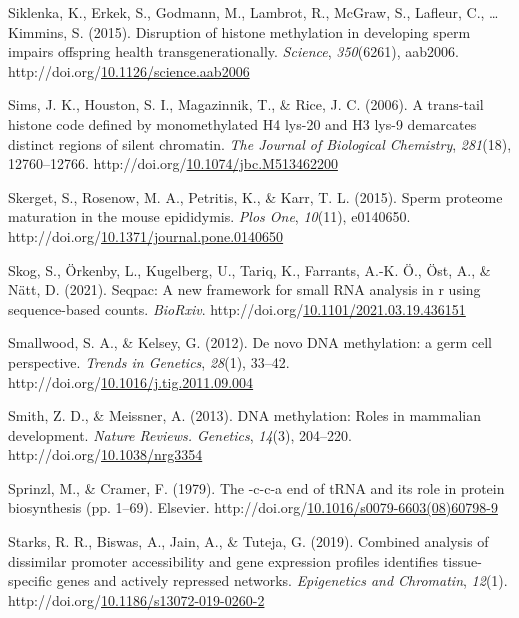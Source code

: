 \documentclass[12pt,twoside]{reedthesis}
\newlength{\cslhangindent}
\newenvironment{CSLReferences}[2] %
 {%
  \setlength{\parindent}{0pt}
  \ifodd #1 \everypar{\setlength{\hangindent}{\cslhangindent}}\ignorespaces\fi
  \ifnum #2 > 0
  \setlength{\parskip}{#2\baselineskip}
  \fi
 }%
 {}
\begin{document}
\begin{CSLReferences}{1}{0}
\leavevmode{}%
Siklenka, K., Erkek, S., Godmann, M., Lambrot, R., McGraw, S., Lafleur, C., \ldots{} Kimmins, S. (2015). Disruption of histone methylation in developing sperm impairs offspring health transgenerationally. \emph{Science}, \emph{350}(6261), aab2006. http://doi.org/\href{https://doi.org/10.1126/science.aab2006}{10.1126/science.aab2006}

\leavevmode{}%
Sims, J. K., Houston, S. I., Magazinnik, T., \& Rice, J. C. (2006). A trans-tail histone code defined by monomethylated H4 lys-20 and H3 lys-9 demarcates distinct regions of silent chromatin. \emph{The Journal of Biological Chemistry}, \emph{281}(18), 12760--12766. http://doi.org/\href{https://doi.org/10.1074/jbc.M513462200}{10.1074/jbc.M513462200}

\leavevmode{}%
Skerget, S., Rosenow, M. A., Petritis, K., \& Karr, T. L. (2015). Sperm proteome maturation in the mouse epididymis. \emph{Plos One}, \emph{10}(11), e0140650. http://doi.org/\href{https://doi.org/10.1371/journal.pone.0140650}{10.1371/journal.pone.0140650}

\leavevmode{}%
Skog, S., Örkenby, L., Kugelberg, U., Tariq, K., Farrants, A.-K. Ö., Öst, A., \& Nätt, D. (2021). Seqpac: A new framework for small RNA analysis in r using sequence-based counts. \emph{BioRxiv}. http://doi.org/\href{https://doi.org/10.1101/2021.03.19.436151}{10.1101/2021.03.19.436151}

\leavevmode{}%
Smallwood, S. A., \& Kelsey, G. (2012). De novo DNA methylation: a germ cell perspective. \emph{Trends in Genetics}, \emph{28}(1), 33--42. http://doi.org/\href{https://doi.org/10.1016/j.tig.2011.09.004}{10.1016/j.tig.2011.09.004}

\leavevmode{}%
Smith, Z. D., \& Meissner, A. (2013). DNA methylation: Roles in mammalian development. \emph{Nature Reviews. Genetics}, \emph{14}(3), 204--220. http://doi.org/\href{https://doi.org/10.1038/nrg3354}{10.1038/nrg3354}

\leavevmode{}%
Sprinzl, M., \& Cramer, F. (1979). The -c-c-a end of tRNA and its role in protein biosynthesis (pp. 1--69). Elsevier. http://doi.org/\href{https://doi.org/10.1016/s0079-6603(08)60798-9}{10.1016/s0079-6603(08)60798-9}

\leavevmode{}%
Starks, R. R., Biswas, A., Jain, A., \& Tuteja, G. (2019). Combined analysis of dissimilar promoter accessibility and gene expression profiles identifies tissue-specific genes and actively repressed networks. \emph{Epigenetics and Chromatin}, \emph{12}(1). http://doi.org/\href{https://doi.org/10.1186/s13072-019-0260-2}{10.1186/s13072-019-0260-2}


\end{CSLReferences}
\end{document}

